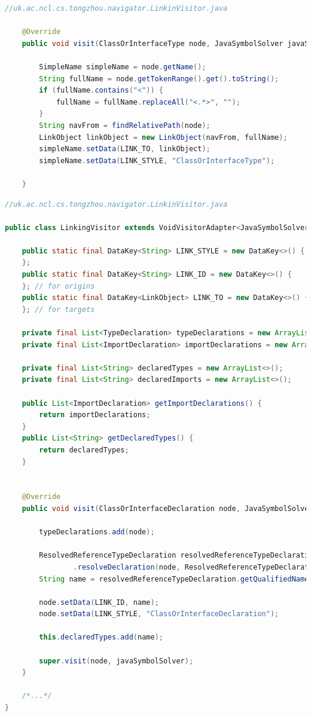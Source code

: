 \documentclass[runningheads]{llncs}
\begin{document}
\begin{lstlisting}[language=Java, caption=Retrieve all occurrence of class and interface type during visiting]
//uk.ac.ncl.cs.tongzhou.navigator.LinkinVisitor.java

	@Override
    public void visit(ClassOrInterfaceType node, JavaSymbolSolver javaSymbolSolver) {

        SimpleName simpleName = node.getName();
        String fullName = node.getTokenRange().get().toString();
        if (fullName.contains("<")) {
            fullName = fullName.replaceAll("<.*>", "");
        }
        String navFrom = findRelativePath(node);
        LinkObject linkObject = new LinkObject(navFrom, fullName);
        simpleName.setData(LINK_TO, linkObject);
        simpleName.setData(LINK_STYLE, "ClassOrInterfaceType");

    }

\end{lstlisting}

\begin{lstlisting}[language=Java, caption=Retrieve type declaration during visiting]
//uk.ac.ncl.cs.tongzhou.navigator.LinkinVisitor.java
	
public class LinkingVisitor extends VoidVisitorAdapter<JavaSymbolSolver> {

    public static final DataKey<String> LINK_STYLE = new DataKey<>() {
    };
    public static final DataKey<String> LINK_ID = new DataKey<>() {
    }; // for origins
    public static final DataKey<LinkObject> LINK_TO = new DataKey<>() {
    }; // for targets

    private final List<TypeDeclaration> typeDeclarations = new ArrayList<>();
    private final List<ImportDeclaration> importDeclarations = new ArrayList<>();

    private final List<String> declaredTypes = new ArrayList<>();
    private final List<String> declaredImports = new ArrayList<>();

    public List<ImportDeclaration> getImportDeclarations() {
        return importDeclarations;
    }
    public List<String> getDeclaredTypes() {
        return declaredTypes;
    }


    @Override
    public void visit(ClassOrInterfaceDeclaration node, JavaSymbolSolver javaSymbolSolver) {

        typeDeclarations.add(node);

        ResolvedReferenceTypeDeclaration resolvedReferenceTypeDeclaration = javaSymbolSolver
                .resolveDeclaration(node, ResolvedReferenceTypeDeclaration.class);
        String name = resolvedReferenceTypeDeclaration.getQualifiedName();

        node.setData(LINK_ID, name);
        node.setData(LINK_STYLE, "ClassOrInterfaceDeclaration");

        this.declaredTypes.add(name);

        super.visit(node, javaSymbolSolver);
	}
	
	/*...*/
}
\end{lstlisting}
\end{document}
